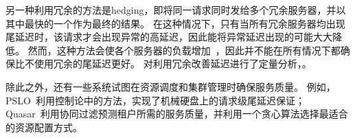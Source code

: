 另一种利用冗余的方法是hedging，即将同一请求同时发给多个冗余服务器，并以其中最快的一个作为最终的结果。
在这种情况下，只有当所有冗余服务器均出现尾延迟时，该请求才会出现异常的高延迟，因此能将异常延迟出现的可能大大降低。
然而，这种方法会使各个服务器的负载增加~\cite{primorac2021hedge}，因此并不能在所有情况下都确保比不使用冗余的尾延迟更好。
\citet{vulimiri2013low}对利用冗余改善延迟进行了定量分析，。

除此之外，还有一些系统试图在资源调度和集群管理时确保服务质量。
例如，PSLO~\cite{li2016pslo}利用控制论中的方法，实现了机械硬盘上的请求级尾延迟保证；
Quasar~\cite{delimitrou2014quasar}利用协同过滤预测租户所需的服务质量，并利用一个贪心算法选择最适合的资源配置方式。